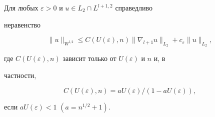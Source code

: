 \begin{prop} 


Для любых $\varepsilon>0$ и $u\in L_2\cap L^{l+1,2}$ справедливо 


неравенство 


$$ 


\|u\|_{W^{l,2}}\le C(U(\varepsilon),n) 


\|\nabla_{l+1}u\|_{L_2}+c_\varepsilon\|u\|_{L_2}, 


$$ 


где $C(U(\varepsilon),n)$ зависит только от $U(\varepsilon)$ и $n$ и, в 


частности, 


$$ 


C(U(\varepsilon),n)=a U(\varepsilon)/ 


(1-a U(\varepsilon)), 


$$ 


если $a{}U(\varepsilon)<1$ $(a=n^{1/2}+1)$. 


\end{prop} 


 


